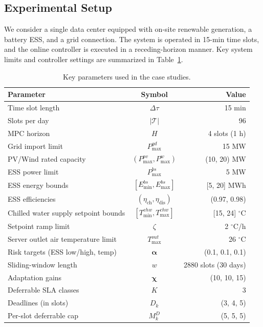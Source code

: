 \documentclass[a4paper,fleqn]{cas-dc}
\theoremstyle{plain}
\theoremstyle{remark}
\theoremstyle{plain}
\begin{document}
\subsection{Experimental Setup}
We consider a single data center equipped with on-site renewable generation, a battery ESS,
and a grid connection. The system is operated in 15-min time slots, and the online controller is executed in a
receding-horizon manner. Key system limits and controller settings are summarized in Table~\ref{tab:exp_params}.

\begin{table}[!htbp]
\caption{Key parameters used in the case studies.}
\label{tab:exp_params}
\centering
\footnotesize
\setlength{\tabcolsep}{4pt}
\renewcommand{\arraystretch}{1.05}
\begin{tabularx}{\linewidth}{@{}Xcr@{}}
\toprule
Parameter & Symbol & Value \\
\midrule
Time slot length & $\Delta\tau$ & 15 min \\
Slots per day & $|\mathcal{T}|$ & 96 \\
MPC horizon & $H$ & 4 slots (1 h) \\
Grid import limit & $P_{\max}^{gd}$ & 15 MW \\
PV/Wind rated capacity & $(P_{\max}^{pv},P_{\max}^{w})$ & (10, 20) MW \\
ESS power limit & $P_{\max}^{bs}$ & 5 MW \\
ESS energy bounds & $[E_{\min}^{bs},E_{\max}^{bs}]$ & [5, 20] MWh \\
ESS efficiencies & $(\eta_{\mathrm{ch}},\eta_{\mathrm{dis}})$ & (0.97, 0.98) \\
Chilled water supply setpoint bounds & $[T_{\min}^{chw},T_{\max}^{chw}]$ & [15, 24] $^\circ$C \\
Setpoint ramp limit & $\zeta$ & 2 $^\circ$C/h \\
Server outlet air temperature limit & $T_{\max}^{out}$ & 26 $^\circ$C \\
Risk targets (ESS low/high, temp) & $\boldsymbol{\alpha}$ & (0.1, 0.1, 0.1) \\
Sliding-window length & $w$ & 2880 slots (30 days) \\
Adaptation gains & $\boldsymbol{\chi}$ & (10, 10, 15) \\
Deferrable SLA classes & $K$ & 3 \\
Deadlines (in slots) & $D_k$ & (3, 4, 5) \\
Per-slot deferrable cap & $M_k^D$ & (5, 5, 5) \\
\bottomrule
\end{tabularx}
\end{table}
\end{document}
